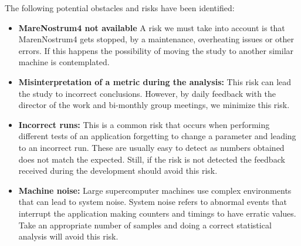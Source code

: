 The following potential obstacles and risks have been identified:
\begin{itemize}
  \item \textbf{MareNostrum4 not available} A risk we must take into account is that MarenNostrum4 gets stopped, by a maintenance, overheating issues or other errors. If this happens the possibility of moving the study to another similar machine is contemplated.
  \item \textbf{Misinterpretation of a metric during the analysis:} This risk can lead the study to incorrect conclusions. However, by daily feedback with the director of the work and bi-monthly group meetings, we minimize this risk.

  \item \textbf{Incorrect runs:} This is a common risk that occurs when performing different tests of an application forgetting to change a parameter and leading to an incorrect run. These are usually easy to detect as numbers obtained does not match the expected. Still, if the risk is not detected the feedback received during the development should avoid this risk.

  \item \textbf{Machine noise:} Large supercomputer machines use complex environments that can lead to system noise. System noise refers to abnormal events that interrupt the application making counters and timings to have erratic values. Take an appropriate number of samples and doing a correct statistical analysis will avoid this risk.

\end{itemize}

